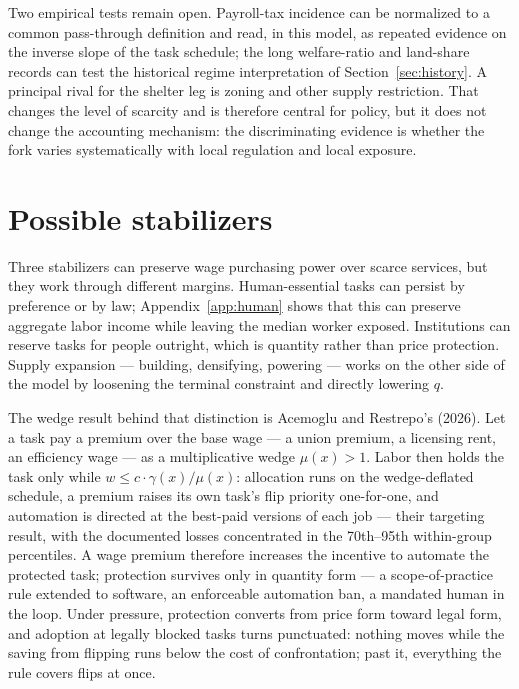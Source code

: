 \documentclass[12pt]{article}
\theoremstyle{plain}
\begin{document}
Two empirical tests remain open. Payroll-tax incidence can be normalized to a common pass-through definition and read, in this model, as repeated evidence on the inverse slope of the task schedule; the long welfare-ratio and land-share records can test the historical regime interpretation of Section~\ref{sec:history}. A principal rival for the shelter leg is zoning and other supply restriction. That changes the level of scarcity and is therefore central for policy, but it does not change the accounting mechanism: the discriminating evidence is whether the fork varies systematically with local regulation and local exposure.

\section{Possible stabilizers}\label{sec:stabilizers}

Three stabilizers can preserve wage purchasing power over scarce services, but they work through different margins. Human-essential tasks can persist by preference or by law; Appendix~\ref{app:human} shows that this can preserve aggregate labor income while leaving the median worker exposed. Institutions can reserve tasks for people outright, which is quantity rather than price protection. Supply expansion --- building, densifying, powering --- works on the other side of the model by loosening the terminal constraint and directly lowering $q$.

The wedge result behind that distinction is Acemoglu and Restrepo's (2026). Let a task pay a premium over the base wage --- a union premium, a licensing rent, an efficiency wage --- as a multiplicative wedge $\mu (x) > 1$. Labor then holds the task only while $w \le c\cdot \gamma (x)/\mu (x)$: allocation runs on the wedge-deflated schedule, a premium raises its own task's flip priority one-for-one, and automation is directed at the best-paid versions of each job --- their targeting result, with the documented losses concentrated in the 70th--95th within-group percentiles. A wage premium therefore increases the incentive to automate the protected task; protection survives only in quantity form --- a scope-of-practice rule extended to software, an enforceable automation ban, a mandated human in the loop. Under pressure, protection converts from price form toward legal form, and adoption at legally blocked tasks turns punctuated: nothing moves while the saving from flipping runs below the cost of confrontation; past it, everything the rule covers flips at once.
\end{document}
